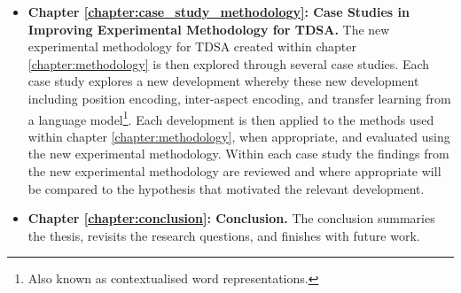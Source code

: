 \begin{itemize}
    \item \textbf{Chapter \ref{chapter:case_study_methodology}: Case Studies in Improving Experimental Methodology for TDSA.}\newline
    The new experimental methodology for TDSA created within chapter \ref{chapter:methodology} is then explored through several case studies. Each case study explores a new development whereby these new development including position encoding, inter-aspect encoding, and transfer learning from a language model\footnote{Also known as contextualised word representations.}. Each development is then applied to the methods used within chapter \ref{chapter:methodology}, when appropriate, and evaluated using the new experimental methodology. Within each case study the findings from the new experimental methodology are reviewed and where appropriate will be compared to the hypothesis that motivated the relevant development.   
    \item \textbf{Chapter \ref{chapter:conclusion}: Conclusion.}\newline
    The conclusion summaries the thesis, revisits the research questions, and finishes with future work.
\end{itemize}